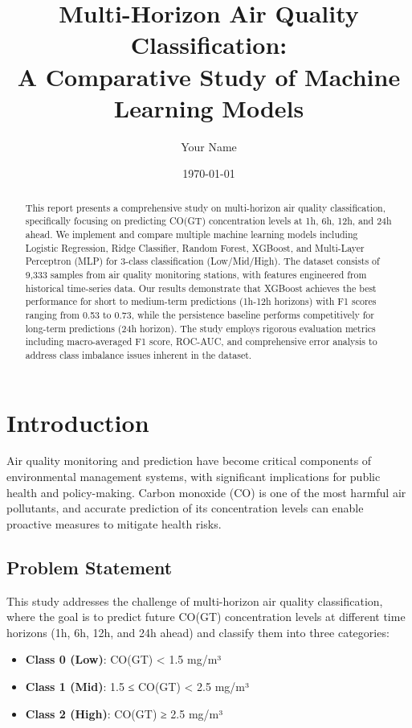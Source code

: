 \documentclass[12pt,a4paper]{article}
\title{Multi-Horizon Air Quality Classification: \\
       A Comparative Study of Machine Learning Models}
\author{Your Name}
\date{\today}
\begin{document}
\maketitle

\begin{abstract}
This report presents a comprehensive study on multi-horizon air quality classification, specifically focusing on predicting CO(GT) concentration levels at 1h, 6h, 12h, and 24h ahead. We implement and compare multiple machine learning models including Logistic Regression, Ridge Classifier, Random Forest, XGBoost, and Multi-Layer Perceptron (MLP) for 3-class classification (Low/Mid/High). The dataset consists of 9,333 samples from air quality monitoring stations, with features engineered from historical time-series data. Our results demonstrate that XGBoost achieves the best performance for short to medium-term predictions (1h-12h horizons) with F1 scores ranging from 0.53 to 0.73, while the persistence baseline performs competitively for long-term predictions (24h horizon). The study employs rigorous evaluation metrics including macro-averaged F1 score, ROC-AUC, and comprehensive error analysis to address class imbalance issues inherent in the dataset.
\end{abstract}

\section{Introduction}

Air quality monitoring and prediction have become critical components of environmental management systems, with significant implications for public health and policy-making. Carbon monoxide (CO) is one of the most harmful air pollutants, and accurate prediction of its concentration levels can enable proactive measures to mitigate health risks.

\subsection{Problem Statement}

This study addresses the challenge of multi-horizon air quality classification, where the goal is to predict future CO(GT) concentration levels at different time horizons (1h, 6h, 12h, and 24h ahead) and classify them into three categories:
\begin{itemize}
    \item \textbf{Class 0 (Low)}: CO(GT) < 1.5 mg/m³
    \item \textbf{Class 1 (Mid)}: 1.5 ≤ CO(GT) < 2.5 mg/m³
    \item \textbf{Class 2 (High)}: CO(GT) ≥ 2.5 mg/m³
\end{itemize}
\end{document}
